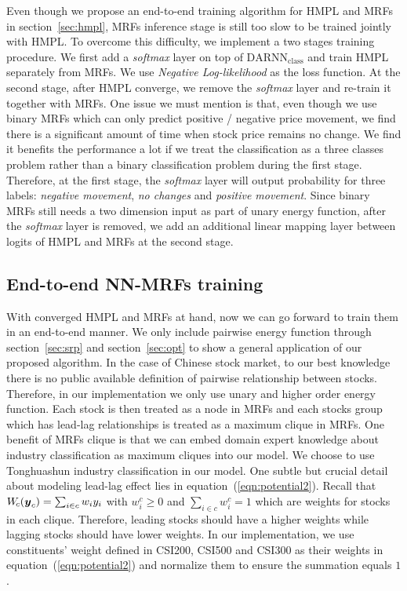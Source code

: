 \documentclass[sigconf,anonymous,review]{acmart}
\renewcommand{\cite}{\citep}
\begin{document}
Even though we propose an end-to-end training algorithm for HMPL
and MRFs in section~\ref{sec:hmpl}, MRFs inference stage is still
too slow to be trained jointly with HMPL. To overcome this
difficulty, we implement a two stages training procedure. We
first add a \emph{softmax} layer on top of
$\text{DARNN}_{\text{class}}$ and train HMPL separately from
MRFs. We use \emph{Negative Log-likelihood} as the loss function.
At the second stage, after HMPL converge, we remove the
\emph{softmax} layer and re-train it together with MRFs. One
issue we must mention is that, even though we use binary MRFs
which can only predict positive / negative price movement, we
find there is a significant amount of time when stock price
remains no change. We find it benefits the performance a lot if
we treat the classification as a three classes problem rather
than a binary classification problem during the first stage.
Therefore, at the first stage, the \emph{softmax} layer will
output probability for three labels: \emph{negative movement},
\emph{no changes} and \emph{positive movement}. Since binary MRFs
still needs a two dimension input as part of unary energy
function, after the \emph{softmax} layer is removed, we add an
additional linear mapping layer between logits of HMPL and MRFs
at the second stage.

\subsection{End-to-end NN-MRFs training}
\label{sec:mrf_train}

With converged HMPL and MRFs at hand, now we can go forward to train
them in an end-to-end manner. We only include pairwise energy function through
section~\ref{sec:srp} and section~\ref{sec:opt} to show a general
application of our proposed algorithm. In the case of Chinese
stock market, to our best knowledge there is no public available
definition of pairwise relationship between stocks. Therefore, in
our implementation we only use unary and higher order energy
function. Each stock is then treated as a node in MRFs and each
stocks group which has lead-lag relationships is treated as a
maximum clique in MRFs. One benefit of MRFs clique is that we can
embed domain expert knowledge about industry classification as
maximum cliques into our model. We choose to use Tonghuashun
industry classification \cite{ths} in our model. One subtle but
crucial detail about modeling lead-lag effect lies in
equation~(\ref{eqn:potential2}). Recall that $W_{\!c}({\boldsymbol{y}}_c) =
\sum_{i \in c} w_i y_i$ with $w^c_i \geq 0$ and $\sum_{i \in c}
w^c_i = 1$ which are weights for stocks in each clique.
Therefore, leading stocks should have a higher weights while
lagging stocks should have lower weights. In our implementation,
we use constituents' weight defined in CSI200, CSI500 and CSI300
as their weights in equation~(\ref{eqn:potential2}) and normalize
them to ensure the summation equals $1$.



\end{document}
